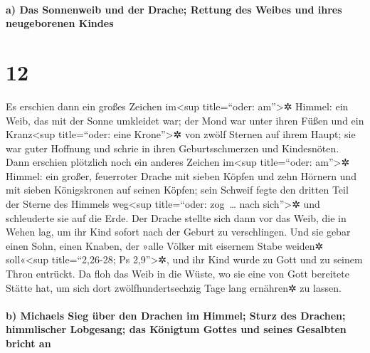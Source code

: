 \hypertarget{a-das-sonnenweib-und-der-drache-rettung-des-weibes-und-ihres-neugeborenen-kindes}{%
\paragraph{a) Das Sonnenweib und der Drache; Rettung des Weibes und
ihres neugeborenen
Kindes}\label{a-das-sonnenweib-und-der-drache-rettung-des-weibes-und-ihres-neugeborenen-kindes}}

\hypertarget{section-11}{%
\section{12}\label{section-11}}

 Es erschien dann ein großes Zeichen im\textless sup
title=``oder: am''\textgreater✲ Himmel: ein Weib, das mit der Sonne
umkleidet war; der Mond war unter ihren Füßen und ein Kranz\textless sup
title=``oder: eine Krone''\textgreater✲ von zwölf Sternen auf ihrem
Haupt;  sie war guter Hoffnung und schrie in ihren
Geburtsschmerzen und Kindesnöten.  Dann erschien plötzlich
noch ein anderes Zeichen im\textless sup title=``oder: am''\textgreater✲
Himmel: ein großer, feuerroter Drache mit sieben Köpfen und zehn Hörnern
und mit sieben Königskronen auf seinen Köpfen;  sein
Schweif fegte den dritten Teil der Sterne des Himmels weg\textless sup
title=``oder: zog~\ldots{} nach sich''\textgreater✲ und schleuderte sie
auf die Erde. Der Drache stellte sich dann vor das Weib, die in Wehen
lag, um ihr Kind sofort nach der Geburt zu verschlingen. 
Und sie gebar einen Sohn, einen Knaben, der »alle Völker mit eisernem
Stabe weiden✲ soll«\textless sup title=``2,26-28; Ps 2,9''\textgreater✲,
und ihr Kind wurde zu Gott und zu seinem Thron entrückt. 
Da floh das Weib in die Wüste, wo sie eine von Gott bereitete Stätte
hat, um sich dort zwölfhundertsechzig Tage lang ernähren✲ zu lassen.

\hypertarget{b-michaels-sieg-uxfcber-den-drachen-im-himmel-sturz-des-drachen-himmlischer-lobgesang-das-kuxf6nigtum-gottes-und-seines-gesalbten-bricht-an}{%
\paragraph{b) Michaels Sieg über den Drachen im Himmel; Sturz des
Drachen; himmlischer Lobgesang; das Königtum Gottes und seines Gesalbten
bricht
an}\label{b-michaels-sieg-uxfcber-den-drachen-im-himmel-sturz-des-drachen-himmlischer-lobgesang-das-kuxf6nigtum-gottes-und-seines-gesalbten-bricht-an}}

